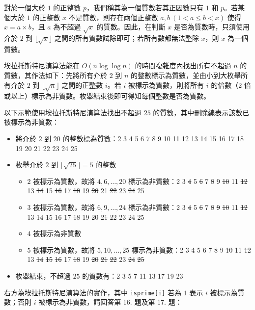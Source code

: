 
對於一個大於 $1$ 的正整數 $p$，我們稱其為一個質數若其正因數只有 $1$ 和 $p$。若某個大於 $1$ 的正整數 $x$ 不是質數，則存在兩個正整數 $a,b\ (1 < a \le b < x)$ 使得 $x = a \times b$，且 $a$ 為不超過 $\sqrt{x}$ 的質數。因此，在判斷 $x$ 是否為質數時，只須使用介於 $2$ 到 $\lfloor\sqrt{x}\rfloor$ 之間的所有質數試除即可；若所有數都無法整除 $x$，則 $x$ 為一個質數。

埃拉托斯特尼演算法能在 $O(n\log\log n)$ 的時間複雜度內找出所有不超過 $n$ 的質數，其作法如下：先將所有介於 $2$ 到 $n$ 的整數標示為質數，並由小到大枚舉所有介於 $2$ 到 $\lfloor\sqrt{n}\rfloor$ 之間的正整數 $i$。若 $i$ 被標示為質數，則將所有 $i$ 的倍數（$2$ 倍或以上）標示為非質數。枚舉結束後即可得知每個整數是否為質數。

以下示範使用埃拉托斯特尼演算法找出不超過 $25$ 的質數，其中刪除線表示該數已被標示為非質數：
\begin{itemize}
    \item 將介於 $2$ 到 $20$ 的整數標為質數：2 3 4 5 6 7 8 9 10 11 12 13 14 15 16 17 18 19 20 21 22 23 24 25
    \item 枚舉介於 $2$ 到 $\lfloor\sqrt{25}\rfloor = 5$ 的整數
    \begin{itemize}
        \item $2$ 被標示為質數，故將 $4,6,\ldots,20$ 標示為非質數：2 3 \sout{4} 5 \sout{6} 7 \sout{8} 9 \sout{10} 11 \sout{12} 13 \sout{14} 15 \sout{16} 17 \sout{18} 19 \sout{20} 21 \sout{22} 23 \sout{24} 25
        \item $3$ 被標示為質數，故將 $6,9,\ldots,24$ 標示為非質數：2 3 \sout{4} 5 \sout{6} 7 \sout{8} \sout{9} \sout{10} 11 \sout{12} 13 \sout{14} \sout{15} \sout{16} 17 \sout{18} 19 \sout{20} \sout{21} \sout{22} 23 \sout{24} 25
        \item $4$ 被標示為非質數
        \item $5$ 被標示為質數，故將 $5,10,\ldots,25$ 標示為非質數：2 3 \sout{4} 5 \sout{6} 7 \sout{8} \sout{9} \sout{10} 11 \sout{12} 13 \sout{14} \sout{15} \sout{16} 17 \sout{18} 19 \sout{20} \sout{21} \sout{22} 23 \sout{24} \sout{25}
    \end{itemize}
    \item 枚舉結束，不超過 $25$ 的質數有：2 3 5 7 11 13 17 19 23
\end{itemize}

右方為埃拉托斯特尼演算法的實作，其中 \texttt{isprime[i]} 若為 $1$ 表示 $i$ 被標示為質數；否則 $i$ 被標示為非質數，請回答第 16. 題及第 17. 題：


